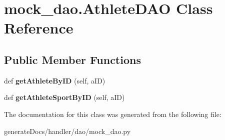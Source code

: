 \hypertarget{classmock__dao_1_1_athlete_d_a_o}{}\section{mock\+\_\+dao.\+Athlete\+D\+AO Class Reference}
\label{classmock__dao_1_1_athlete_d_a_o}
\subsection*{Public Member Functions}
\begin{DoxyCompactItemize}
\item 
\mbox{\label{classmock__dao_1_1_athlete_d_a_o_a7504b3bea19bfaa4b215eb019845794e}} 
def {\bfseries get\+Athlete\+By\+ID} (self, a\+ID)
\item 
\mbox{\label{classmock__dao_1_1_athlete_d_a_o_a7a5bc26108cd51c63912df253330712f}} 
def {\bfseries get\+Athlete\+Sport\+By\+ID} (self, a\+ID)
\end{DoxyCompactItemize}


The documentation for this class was generated from the following file\+:\begin{DoxyCompactItemize}
\item 
generate\+Docs/handler/dao/mock\+\_\+dao.\+py\end{DoxyCompactItemize}
